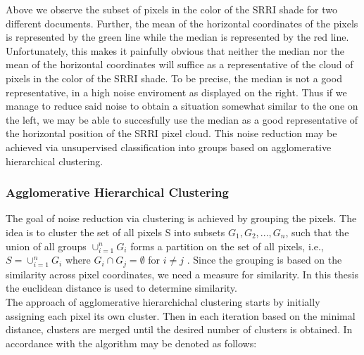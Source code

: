 \documentclass[aodsor,preprint]{imsart}
\numberwithin{equation}{section}
\theoremstyle{plain}
\begin{document}
Above we observe the subset of pixels in the color of the SRRI shade for two different documents. Further, the mean of the horizontal coordinates of the pixels is represented by the green line while the median is represented by the red line. Unfortunately, this makes it painfully obvious that neither the median nor the mean of the horizontal coordinates will suffice as a representative of the cloud of pixels in the color of the SRRI shade. To be precise, the median is not a good representative, in a high noise enviroment as displayed on the right. Thus if we manage to reduce said noise to obtain a situation somewhat similar to the one on the left, we may be able to succesfully use the median as a good representative of the horizontal position of the SRRI pixel cloud. This noise reduction may be achieved via unsupervised classification into groups based on agglomerative hierarchical clustering.
\newpage
\subsubsection{Agglomerative Hierarchical Clustering}
The goal of noise reduction via clustering is achieved by grouping the pixels. The idea is to cluster the set of all pixels S into subsets $G_1, G_2,..., G_n$, such that the union of all groups $\cup_{i = 1}^n G_i$ forms a partition on the set of all pixels, i.e., $S = \cup_{i = 1}^n G_i$ where $G_i \cap G_j = \emptyset$ for $i \neq j$ \citep{Rok09}. Since the grouping is based on the similarity across pixel coordinates, we need a measure for similarity. In this thesis the euclidean distance is used to determine similarity.\\
The approach of agglomerative hierarchichal clustering starts by initially assigning each pixel its own cluster. Then in each iteration based on the minimal distance, clusters are merged until the desired number of clusters is obtained. In accordance with \citet{RPA2018} the algorithm may be denoted as follows:

\end{document}
